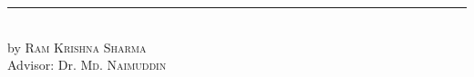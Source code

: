 \begin{titlepage}
\begin{addmargin}[-1cm]{-1cm}
\begin{center}
        \rule{14cm}{0.4pt}\\ \vskip1cm
        by \textsc{Ram Krishna Sharma}\\
        \vfill
        Advisor: Dr. \textsc{Md. Naimuddin}\\

        \vfill
        \vfill
        \vfill

    \end{center}
  \end{addmargin}
\end{titlepage}